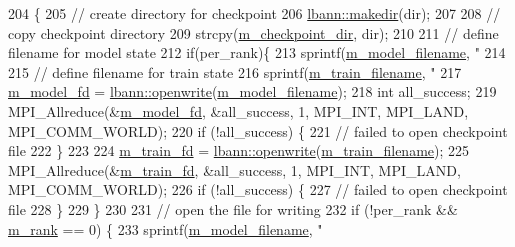 \begin{DoxyCode}
204                                                                                \{
205   \textcolor{comment}{// create directory for checkpoint}
206   \hyperlink{namespacelbann_a8830dea8eef0ab5b93d68e2358ceeb1a}{lbann::makedir}(dir);
207 
208   \textcolor{comment}{// copy checkpoint directory}
209   strcpy(\hyperlink{classlbann_1_1persist_a17c2b08ec1815aba6d3eae6502397bb1}{m\_checkpoint\_dir}, dir);
210 
211   \textcolor{comment}{// define filename for model state}
212   \textcolor{keywordflow}{if}(per\_rank)\{
213     sprintf(\hyperlink{classlbann_1_1persist_ac01cd3c8fe0f97c1312ca1a595f2f690}{m\_model\_filename}, \textcolor{stringliteral}{"%
214 
215     \textcolor{comment}{// define filename for train state}
216     sprintf(\hyperlink{classlbann_1_1persist_a417a443c894fd07472504936f5b02b62}{m\_train\_filename}, \textcolor{stringliteral}{"%
217     \hyperlink{classlbann_1_1persist_a1adc7102c1b4bc91534ca156decbd965}{m\_model\_fd} = \hyperlink{namespacelbann_af596e6d2be603e9cf808c98f5412490a}{lbann::openwrite}(\hyperlink{classlbann_1_1persist_ac01cd3c8fe0f97c1312ca1a595f2f690}{m\_model\_filename});
218     \textcolor{keywordtype}{int} all\_success;
219     MPI\_Allreduce(&\hyperlink{classlbann_1_1persist_a1adc7102c1b4bc91534ca156decbd965}{m\_model\_fd}, &all\_success, 1, MPI\_INT, MPI\_LAND, MPI\_COMM\_WORLD);
220     \textcolor{keywordflow}{if} (!all\_success) \{
221         \textcolor{comment}{// failed to open checkpoint file}
222       \}
223       
224       \hyperlink{classlbann_1_1persist_a817671390811dde04670c47139402f51}{m\_train\_fd} = \hyperlink{namespacelbann_af596e6d2be603e9cf808c98f5412490a}{lbann::openwrite}(\hyperlink{classlbann_1_1persist_a417a443c894fd07472504936f5b02b62}{m\_train\_filename});
225       MPI\_Allreduce(&\hyperlink{classlbann_1_1persist_a817671390811dde04670c47139402f51}{m\_train\_fd}, &all\_success, 1, MPI\_INT, MPI\_LAND, MPI\_COMM\_WORLD);
226       \textcolor{keywordflow}{if} (!all\_success) \{
227         \textcolor{comment}{// failed to open checkpoint file}
228       \}
229   \}
230   
231   \textcolor{comment}{// open the file for writing}
232   \textcolor{keywordflow}{if} (!per\_rank && \hyperlink{classlbann_1_1persist_aa99b1b0079bb10471472bf6f1d966deb}{m\_rank} == 0) \{
233      sprintf(\hyperlink{classlbann_1_1persist_ac01cd3c8fe0f97c1312ca1a595f2f690}{m\_model\_filename}, \textcolor{stringliteral}{"%
}}}
\end{DoxyCode}

